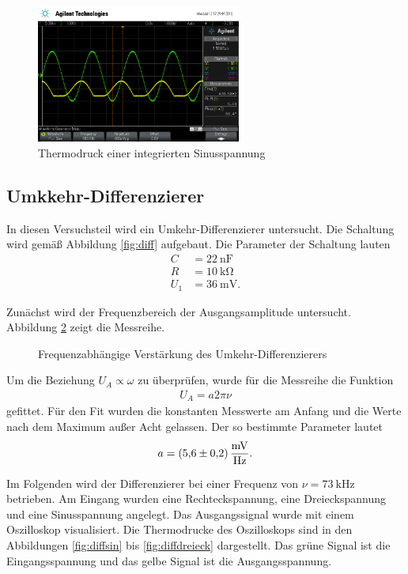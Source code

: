 \begin{figure}
	\centering
	\includegraphics[width=0.6\textwidth]{img/scope_3_int_sin.png}
	\caption{Thermodruck einer integrierten Sinusspannung}
	\label{fig:intsin}
\end{figure}

\subsection{Umkkehr-Differenzierer}
In diesen Versuchsteil wird ein Umkehr-Differenzierer untersucht.
Die Schaltung wird gemäß Abbildung \ref{fig:diff} aufgebaut.
Die Parameter der Schaltung lauten
\begin{align}
	C &= \SI{22}{\nano \farad} \\
	R &= \SI{10}{\kilo \ohm} \\
	U_1 &= \SI{36}{\milli \volt}.
\end{align}

Zunächst wird der Frequenzbereich der Ausgangsamplitude untersucht.
Abbildung \ref{fig:plotdiff} zeigt die Messreihe.
\begin{figure}
	\centering
	\resizebox{\pltwidth}{!}{
		
	}
	\caption{Frequenzabhängige Verstärkung des Umkehr-Differenzierers}
	\label{fig:plotdiff}
\end{figure}
Um die Beziehung $U_A \propto \omega$ zu überprüfen, wurde für die Messreihe die Funktion 
\begin{align}
	U_A = a 2 \pi \nu
\end{align}
gefittet.
Für den Fit wurden die konstanten Messwerte am Anfang und die Werte nach dem Maximum außer Acht gelassen.
Der so bestimmte Parameter lautet
\begin{align}
	a = \SI{5.6 \pm 0.2}{\milli\volt \per \hertz}. 
\end{align}

Im Folgenden wird der Differenzierer bei einer Frequenz von $\nu = \SI{73}{\kilo \hertz}$ betrieben.
Am Eingang wurden eine Rechteckspannung, eine Dreieckspannung und eine Sinusspannung angelegt.
Das Ausgangssignal wurde mit einem Oszilloskop visualisiert.
Die Thermodrucke des Oszilloskops sind in den Abbildungen \ref{fig:diffsin} bis \ref{fig:diffdreieck} dargestellt.
Das grüne Signal ist die Eingangsspannung und das gelbe Signal ist die Ausgangsspannung.

